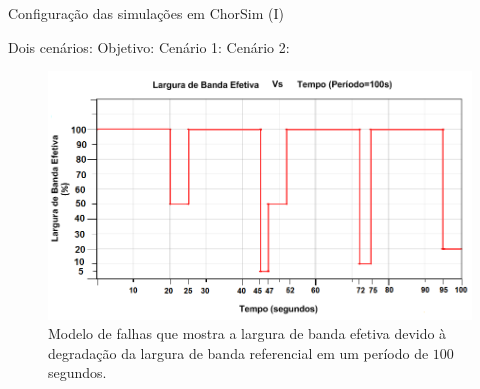 \documentclass[xcolor=svgnames]{beamer}
\begin{document}
  \begin{frame}{Configuração das simulações em ChorSim (I)}  
      
  Dois cenários:
  Objetivo: 
  Cenário 1:
  Cenário 2: 

	\begin{figure}[!h]
	    \centering
	    \includegraphics[width=.8\linewidth]{figures/failure_model.png}
	    \caption{Modelo de falhas que mostra a largura de banda efetiva devido à degradação da largura de banda referencial em um período de $100$ segundos.}
	    \label{figure:failure_model}
	\end{figure}
  \end{frame}
  
\end{document}
